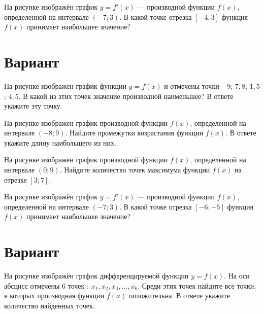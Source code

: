 \begin{taskBN}{4}
На рисунке изображён график $y=f'(x)$ — производной функции $f(x)$, определенной на интервале $(-7;3)$. В какой точке отрезка $[-4; 3]$ функция $f(x)$ принимает наибольшее значение?
\end{taskBN}

\newpage\section{Вариант}\begin{taskBN}{1}
На рисунке изображен график функции $y=f(x)$ и отмечены точки $-9$; $7,8$; $1,5$; $4,5$. В какой из этих точек значение производной наименьшее? В ответе укажите эту точку. 
\end{taskBN}

\begin{taskBN}{2}
На рисунке изображен график производной функции $f(x)$, определенной на интервале $(-8;9)$. Найдите промежутки возрастания функции $f(x)$. В ответе укажите длину наибольшего из них.
\end{taskBN}

\begin{taskBN}{3}
На рисунке изображен график производной функции $f(x)$, определенной на интервале $(0;9)$. Найдите количество точек максимума функции $f(x)$ на отрезке $[3;7]$. 
\end{taskBN}

\begin{taskBN}{4}
На рисунке изображён график $y=f'(x)$ — производной функции $f(x)$, определенной на интервале $(-7;3)$. В какой точке отрезка $[-6; -5]$ функция $f(x)$ принимает наибольшее значение?
\end{taskBN}

\newpage\section{Вариант}\begin{taskBN}{1}
На рисунке изображён график дифференцируемой функции $y=f(x)$. На оси абсцисс отмечены 6 точек : $x_1, x_2, x_3, \dots, x_6$. Среди этих точек найдите все точки, в которых производная функции $f(x)$ положительна. В ответе укажите количество найденных точек.
\end{taskBN}

